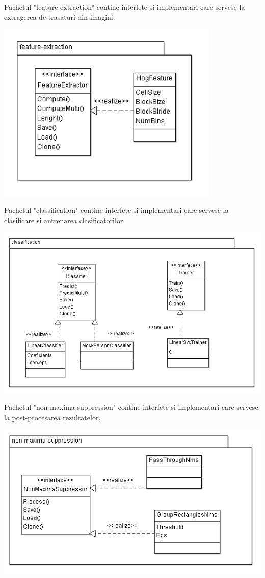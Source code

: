 Pachetul "feature-extraction" contine interfete si implementari care servesc la extragerea de trasaturi din imagini.
\begin{center}
	\includegraphics[width=0.8\textwidth]{uml/feature_extraction_diagram.png}
\end{center}

Pachetul "classification" contine interfete si implementari care servesc la clasificare si antrenarea clasificatorilor.
\begin{center}
	\includegraphics[width=1.00\textwidth]{uml/classification_diagram.png}
\end{center}

Pachetul "non-maxima-suppression" contine interfete si implementari care servesc la post-procesarea rezultatelor.
\begin{center}
	\includegraphics[width=1.00\textwidth]{uml/nms_diagram.png}
\end{center}

